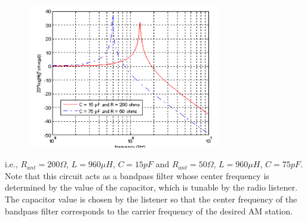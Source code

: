 \documentclass [utf8] {article}
\begin{document}
{	\begin{figure}[H]
		\begin{small}
			\begin{center}
				\includegraphics[width=0.75\textwidth]{figures/Figure3.png}
			\end{center}
			\caption{}
			\label{fig:front-end}
		\end{small}
	\end{figure}

	i.e., $R_{ant} = 200 \Omega$, $L = 960 \mu H$, $C = 15 pF$ and $R_{ant} = 50 \Omega$, $L = 960 \mu H$, $C = 75 pF$. Note that this circuit acts as a bandpass filter whose center frequency is determined by the value of the capacitor, which is tunable by the radio listener. The capacitor value is chosen by the listener so that the center frequency of the bandpass filter corresponds to the carrier frequency of the desired AM station.
}
\end{document}
